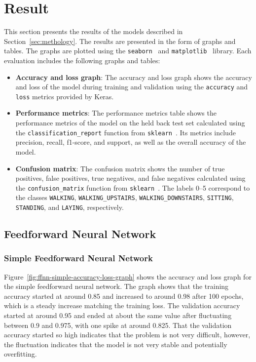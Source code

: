 \section{Result}\label{sec:result}

This section presents the results of the models described in Section~\ref{sec:methology}.
The results are presented in the form of graphs and tables.
The graphs are plotted using the \texttt{seaborn}~\cite{seaborn} and \texttt{matplotlib}~\cite{matplot} library.
Each evaluation includes the following graphs and tables:
\begin{itemize}
    \item \textbf{Accuracy and loss graph}:
          The accuracy and loss graph shows the accuracy and loss of the model during training and validation
          using the \texttt{accuracy} and \texttt{loss} metrics provided by Keras.
    \item \textbf{Performance metrics}:
          The performance metrics table shows the performance metrics of the model on the held back test set calculated using the \texttt{classification\_report} function from \texttt{sklearn}~\cite{scikit-learn}.
          Its metrics include precision, recall, f1-score, and support, as well as the overall accuracy of the model.
    \item \textbf{Confusion matrix}:
          The confusion matrix shows the number of true positives, false positives, true negatives,
    and false negatives calculated using the \texttt{confusion\_matrix} function from \texttt{sklearn}~\cite{scikit-learn}.
          The labels 0--5 correspond to the classes \texttt{WALKING}, \texttt{WALKING\_UPSTAIRS},
    \texttt{WALKING\_DOWNSTAIRS}, \texttt{SITTING}, \texttt{STANDING},
    and \texttt{LAYING}, respectively.
\end{itemize}

\subsection{Feedforward Neural Network}\label{subsec:feedforward-neural-network}

\subsubsection{Simple Feedforward Neural Network}

Figure~\ref{fig:ffnn-simple-accuracy-loss-graph} shows the accuracy and loss graph for the simple feedforward neural network.
The graph shows that the training accuracy started at around 0.85 and increased to around 0.98 after 100 epochs,
which is a steady increase matching the training loss.
The validation accuracy started at around 0.95
and ended at about the same value after fluctuating between 0.9 and 0.975,
with one spike at around 0.825.
That the validation accuracy started so high indicates that the problem is not very difficult,
however, the fluctuation indicates that the model is not very stable and potentially overfitting.

